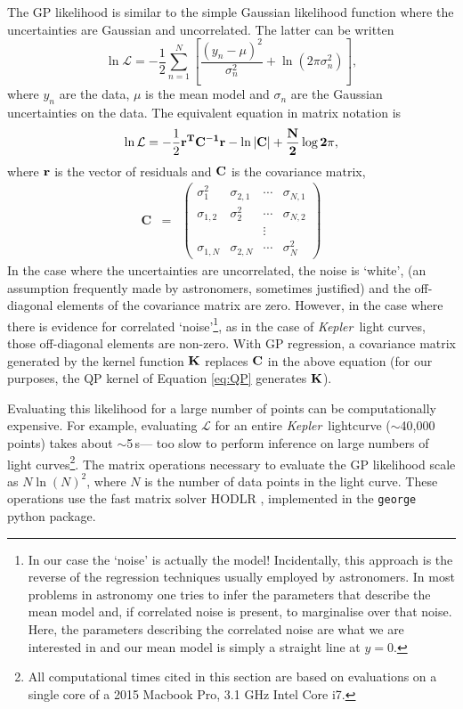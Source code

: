 \documentclass[a4paper,fleqn,usenatbib,useAMS]{mnras}
\newcommand{\Kepler}{{\it Kepler}}
\begin{document}
The GP likelihood is similar to the simple Gaussian likelihood
function where the uncertainties are
Gaussian and uncorrelated. The latter can be written
\begin{equation}
    \ln \mathcal{L} = -\frac{1}{2}\sum_{n=1}^N\left[\frac{(y_n-\mu)^2}{\sigma_n^2}
    + \ln(2\pi\sigma_n^2)\right],
\end{equation}
\label{eq:chi2}
where $y_n$ are the data, $\mu$ is the mean model and $\sigma_n$ are the
Gaussian uncertainties on the data.
The equivalent equation in matrix notation is
\begin{equation}
\ln \mathcal{L} = -\frac{1}{2}\bf{r}^T\bf{C}^{-1}\bf{r}-\ln|\bf{C}|
    + \frac{N}{2}\log2\pi,
\end{equation}
\label{eq:lhf1}
where $\bf{r}$ is the vector of residuals and $\bf{C}$ is the covariance
matrix,
\begin{eqnarray}
    \mathbf{C} &=& \left (\begin{array}{cccc}
    \sigma^2_1 & \sigma_{2, 1} & \cdots & \sigma_{N, 1} \\
    \sigma_{1, 2} & \sigma^2_2 & \cdots & \sigma_{N, 2} \\
    && \vdots & \\
    \sigma_{1, N} & \sigma_{2, N} & \cdots & \sigma^2_N
\end{array}\right )
\end{eqnarray}
In the case where the uncertainties are uncorrelated, the noise is `white',
(an assumption frequently made by astronomers, sometimes justified)
and the off-diagonal elements of the covariance matrix are zero.
However, in the case where there is evidence for correlated
`noise'\footnote{In our case the `noise' is actually the model!  Incidentally, this approach is the reverse of the regression techniques
usually employed by astronomers.
In most problems in astronomy one tries to infer the parameters that describe
the mean model and, if correlated noise is present, to marginalise over that
noise.
Here, the parameters describing the correlated noise are what we are
interested in and our mean model is simply a straight line at $y=0$.}, as in the
case of \Kepler\ light curves, those off-diagonal elements are non-zero.
With GP regression, a covariance matrix generated by the kernel function
${\bf K}$ replaces ${\bf C}$ in the above equation (for our purposes, the QP
kernel of Equation \ref{eq:QP} generates ${\bf K}$).

Evaluating this likelihood for a large number of points can be computationally
expensive.
For example, evaluating $\mathcal L$ for an entire \Kepler\ lightcurve
($\sim$40,000 points) takes about $\sim$5\,s--- too slow to perform inference
on large numbers of light curves\footnote{All computational times cited in
this section are based on evaluations on a single core of a 2015 Macbook Pro,
3.1 GHz Intel Core i7.}.
The matrix operations necessary to evaluate the GP likelihood scale as
$N\ln(N)^2$, where $N$ is the number of data points in the light curve.
These operations use the fast matrix solver HODLR \citep{Ambikasaran2014},
implemented in the {\tt george} \citep{George} python package.
\end{document}
